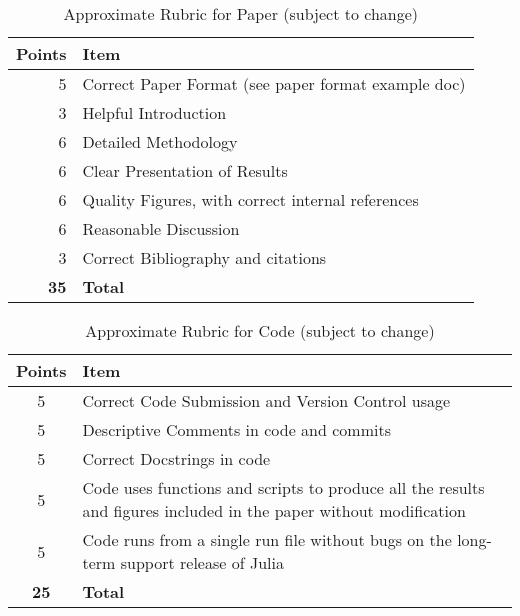 \documentclass[12pt]{article}
\begin{document}
\begin{table}[h!]
	\caption{Approximate Rubric for Paper (subject to change)}
	\label{tab:paperrubric}
	\renewcommand{\arraystretch}{1.2}
	\vspace{1em}
	\begin{tabular}{r|p{5in}}
		\textbf{Points} & \textbf{Item} \\ 
		\hline
		5 & Correct Paper Format (see paper format example doc) \\
		3 & Helpful Introduction \\
		6 & Detailed Methodology \\
		6 & Clear Presentation of Results \\
		6 & Quality Figures, with correct internal references \\
		6 & Reasonable Discussion \\
		3 & Correct Bibliography and citations \\
		\textbf{35} & \textbf{Total}
	\end{tabular}
\end{table}

\begin{table}[h!]
	\caption{Approximate Rubric for Code (subject to change)}
	\label{tab:coderubric}
	\renewcommand{\arraystretch}{1.2}
	\vspace{1em}
	\begin{tabular}{c|p{5in}}
		\textbf{Points} & \textbf{Item} \\ 
		\hline
		5 & Correct Code Submission and Version Control usage\\
		5 & Descriptive Comments in code and commits \\
		5 & Correct Docstrings in code\\
		5 & Code uses functions and scripts to produce all the results and figures included in the paper without modification \\
		5 & Code runs from a single run file without bugs on the long-term support release of Julia\\
		\textbf{25} & \textbf{Total}
	\end{tabular}
\end{table}
	
\end{document}

